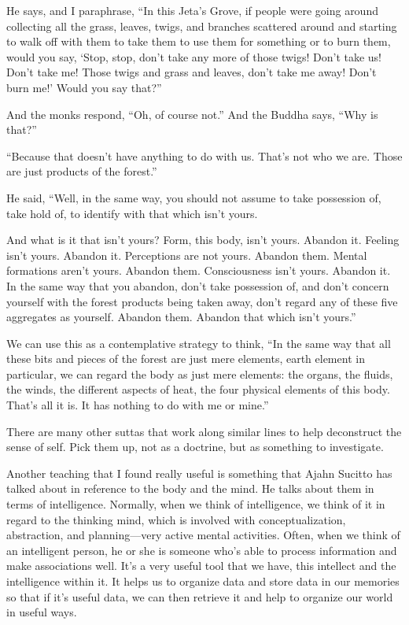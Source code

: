 He says, and I paraphrase, ``In this Jeta's Grove, if people were going around collecting all the grass, leaves, twigs, and branches scattered around and starting to walk off with them to take them to use them for something or to burn them, would you say, `Stop, stop, don't take any more of those twigs! Don't take us! Don't take me! Those twigs and grass and leaves, don't take me away! Don't burn me!' Would you say that?''


And the monks respond, ``Oh, of course not.'' And the Buddha says, ``Why is that?''

``Because that doesn't have anything to do with us. That's not who we are. Those are just products of the forest.''

He said, ``Well, in the same way, you should not assume to take possession of, take hold of, to identify with that which isn't yours.

And what is it that isn't yours? Form, this body, isn't yours. Abandon it. Feeling isn't yours. Abandon it. Perceptions are not yours. Abandon them. Mental formations aren't yours. Abandon them. Consciousness isn't yours. Abandon it. In the same way that you abandon, don't take possession of, and don't concern yourself with the forest products being taken away, don't regard any of these five aggregates as yourself. Abandon them. Abandon that which isn't yours.''

We can use this as a contemplative strategy to think, ``In the same way that all these bits and pieces of the forest are just mere elements, earth element in particular, we can regard the body as just mere elements: the organs, the fluids, the winds, the different aspects of heat, the four physical elements of this body. That's all it is. It has nothing to do with me or mine.''

There are many other suttas that work along similar lines to help deconstruct the sense of self. Pick them up, not as a doctrine, but as something to investigate.

Another teaching that I found really useful is something that Ajahn Sucitto has talked about in reference to the body and the mind. He talks about them in terms of intelligence. Normally, when we think of intelligence, we think of it in regard to the thinking mind, which is involved with conceptualization, abstraction, and planning---very active mental activities. Often, when we think of an intelligent person, he or she is someone who's able to process information and make associations well. It's a very useful tool that we have, this intellect and the intelligence within it. It helps us to organize data and store data in our memories so that if it's useful data, we can then retrieve it and help to organize our world in useful ways.

